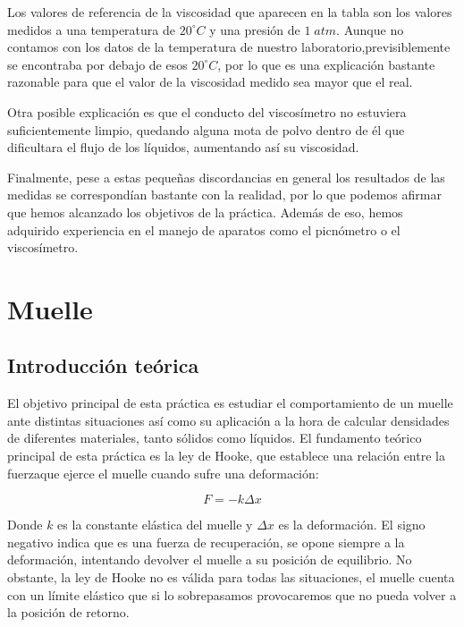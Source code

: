 \documentclass[a4paper,12pt,titlepage]{report}
\begin{document}
\newpage

Los valores de referencia de la viscosidad que aparecen en la tabla son los valores medidos a una temperatura de $20^{\circ}C$ y una presión de $ 1 \;atm$. Aunque no contamos con los datos de la temperatura de nuestro laboratorio,previsiblemente se encontraba por debajo de esos $20^{\circ}C$, por lo que es una explicación bastante razonable para que el valor de la viscosidad medido sea mayor que el real. 

\par Otra posible explicación es que el conducto del viscosímetro no estuviera suficientemente limpio, quedando alguna mota de polvo dentro de él que dificultara el flujo de los líquidos, aumentando así su viscosidad.

\par Finalmente, pese a estas pequeñas discordancias en general los resultados de las medidas se correspondían bastante con la realidad, por lo que podemos afirmar que hemos alcanzado los objetivos de la práctica. Además de eso, hemos adquirido experiencia en el manejo de aparatos como el picnómetro o el viscosímetro.

\chapter{Muelle}

\section{Introducción teórica}

El objetivo principal de esta práctica es estudiar el comportamiento de un muelle ante distintas situaciones así como su aplicación a la hora de calcular densidades de diferentes materiales, tanto sólidos como líquidos. El fundamento teórico principal de esta práctica es la ley de Hooke, que establece una relación entre la fuerzaque ejerce el muelle cuando sufre una deformación:

\begin{equation}
    F = -k\Delta x
\end{equation}

Donde $k$ es la constante elástica del muelle y $\Delta x$ es la deformación. El signo negativo indica que es una fuerza de recuperación, se opone siempre a la deformación, intentando devolver el muelle a su posición de equilibrio. No obstante, la ley de Hooke no es válida para todas las situaciones, el muelle cuenta con un límite elástico que si lo sobrepasamos provocaremos que no pueda volver a la posición de retorno.
\end{document}
